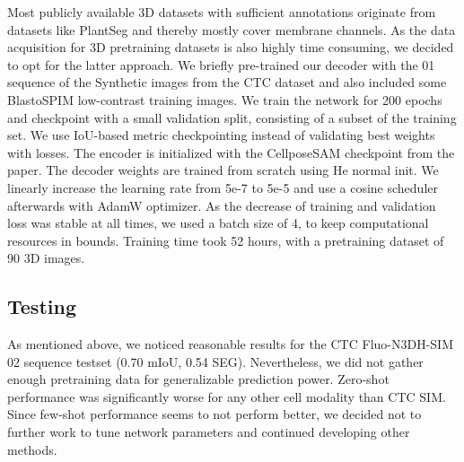 Most publicly available 3D datasets with sufficient annotations originate from datasets like PlantSeg and thereby mostly cover membrane channels. As the data acquisition for 3D pretraining datasets is also highly time consuming, we decided to opt for the latter approach. We briefly pre-trained our decoder with the 01 sequence of the Synthetic images from the CTC dataset and also included some BlastoSPIM low-contrast training images. We train the network for 200 epochs and checkpoint with a small validation split, consisting of a subset of the training set. We use IoU-based metric checkpointing instead of validating best weights with losses. The encoder is initialized with the CellposeSAM checkpoint from the paper. The decoder weights are trained from scratch using He normal init. We linearly increase the learning rate from 5e-7 to 5e-5 and use a cosine scheduler afterwards with AdamW optimizer. As the decrease of training and validation loss was stable at all times, we used a batch size of 4, to keep computational resources in bounds. Training time took 52 hours, with a pretraining dataset of 90 3D images.

\subsection{Testing}

As mentioned above, we noticed reasonable results for the CTC Fluo-N3DH-SIM 02 sequence testset (0.70 mIoU, 0.54 SEG). Nevertheless, we did not gather enough pretraining data for generalizable prediction power. Zero-shot performance was significantly worse for any other cell modality than CTC SIM. Since few-shot performance seems to not perform better, we decided not to further work to tune network parameters and continued developing other methods.